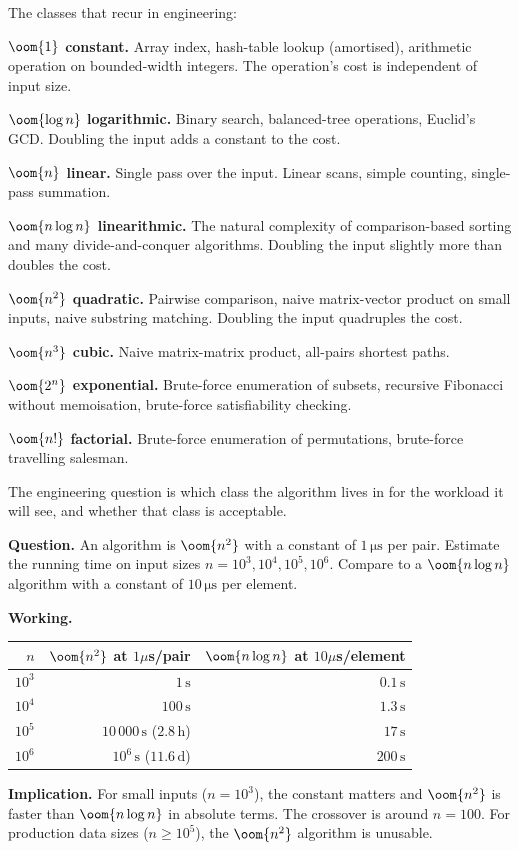 The classes that recur in engineering:

\textbf{$\oom{1}$ constant.} Array index, hash-table lookup (amortised), arithmetic operation on bounded-width integers. The operation's cost is independent of input size.

\textbf{$\oom{\log n}$ logarithmic.} Binary search, balanced-tree operations, Euclid's GCD. Doubling the input adds a constant to the cost.

\textbf{$\oom{n}$ linear.} Single pass over the input. Linear scans, simple counting, single-pass summation.

\textbf{$\oom{n \log n}$ linearithmic.} The natural complexity of comparison-based sorting and many divide-and-conquer algorithms. Doubling the input slightly more than doubles the cost.

\textbf{$\oom{n^2}$ quadratic.} Pairwise comparison, naive matrix-vector product on small inputs, naive substring matching. Doubling the input quadruples the cost.

\textbf{$\oom{n^3}$ cubic.} Naive matrix-matrix product, all-pairs shortest paths.

\textbf{$\oom{2^n}$ exponential.} Brute-force enumeration of subsets, recursive Fibonacci without memoisation, brute-force satisfiability checking.

\textbf{$\oom{n!}$ factorial.} Brute-force enumeration of permutations, brute-force travelling salesman.

The engineering question is which class the algorithm lives in for the workload it will see, and whether that class is acceptable.

\begin{estimation}
\textbf{Question.} An algorithm is $\oom{n^2}$ with a constant of $1\,\si{\micro\second}$ per pair. Estimate the running time on input sizes $n = 10^3, 10^4, 10^5, 10^6$. Compare to a $\oom{n \log n}$ algorithm with a constant of $10\,\si{\micro\second}$ per element.

\textbf{Working.}
\begin{tabular}{rrr}
\toprule
$n$ & $\oom{n^2}$ at $1\mu$s/pair & $\oom{n \log n}$ at $10\mu$s/element \\
\midrule
$10^3$ & $1\,\si{\second}$ & $0.1\,\si{\second}$ \\
$10^4$ & $100\,\si{\second}$ & $1.3\,\si{\second}$ \\
$10^5$ & $10\,000\,\si{\second}$ ($2.8\,\si{\hour}$) & $17\,\si{\second}$ \\
$10^6$ & $10^6\,\si{\second}$ ($11.6\,\si{\day}$) & $200\,\si{\second}$ \\
\bottomrule
\end{tabular}

\textbf{Implication.} For small inputs ($n = 10^3$), the constant matters and $\oom{n^2}$ is faster than $\oom{n \log n}$ in absolute terms. The crossover is around $n = 100$. For production data sizes ($n \geq 10^5$), the $\oom{n^2}$ algorithm is unusable.
\end{estimation}

